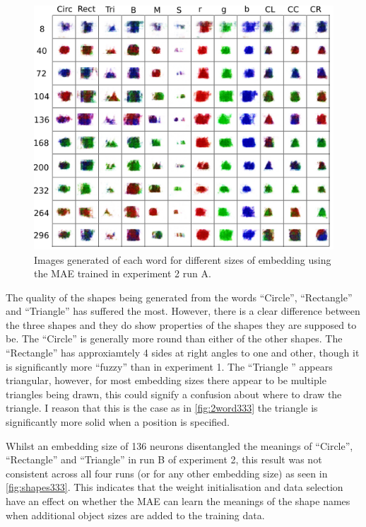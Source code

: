 \begin{figure}[h]
\centering
\includegraphics[width=\textwidth]{Figs/shapes/singlelabel333A.png}
\caption{Images generated of each word for different sizes of embedding using the MAE trained in experiment 2 run A.}
\label{fig:333single}
\end{figure} 

The quality of the shapes being generated from the words ``Circle'', ``Rectangle'' and ``Triangle'' has suffered the most. However, there is a clear difference between the three shapes and they do show properties of the shapes they are supposed to be. The ``Circle'' is generally more round than either of the other shapes. The ``Rectangle'' has approxiamtely 4 sides at right angles to one and other, though it is significantly more ``fuzzy'' than in experiment 1. The ``Triangle '' appears triangular, however, for most embedding sizes there appear to be multiple triangles being drawn, this could signify a confusion about where to draw the triangle. I reason that this is the case as in \autoref{fig:2word333} the triangle is significantly more solid when a position is specified. 

Whilst an embedding size of 136 neurons disentangled the meanings of ``Circle'', ``Rectangle'' and ``Triangle'' in run B of experiment 2, this result was not consistent across all four runs (or for any other embedding size) as seen in \autoref{fig:shapes333}. This indicates that the weight initialisation and data selection have an effect on whether the MAE can learn the meanings of the shape names  when additional object sizes are added to the training data.

